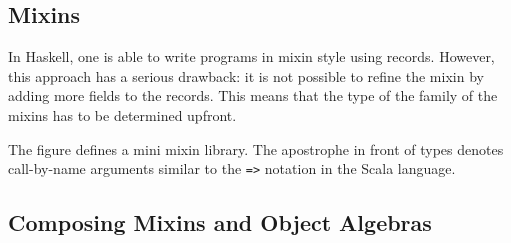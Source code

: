 \subsection{Mixins}



In Haskell, one is able to write programs in mixin style using records. However,
this approach has a serious drawback: it is not possible to refine the mixin by
adding more fields to the records. This means that the type of the family of the
mixins has to be determined upfront.

The figure defines a mini mixin library. The apostrophe in front of types
denotes call-by-name arguments similar to the \lstinline{=>} notation in the
Scala language.

\subsection{Composing Mixins and Object Algebras}
